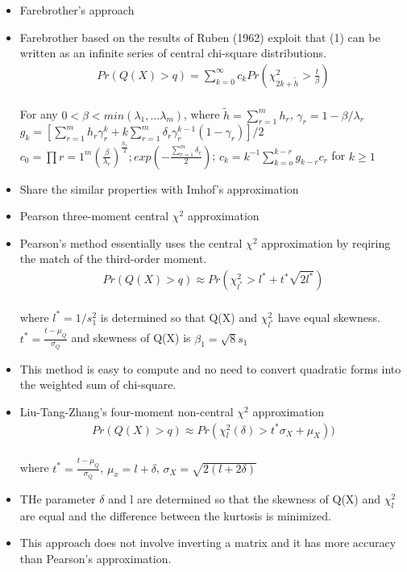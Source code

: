\documentclass[10pt]{beamer}
\begin{document}
\begin{frame}
	\begin{itemize}
	\item Farebrother's approach
	\item Farebrother based on the results of Ruben (1962) exploit that (1) can be written as an infinite series of central chi-square distributions.
	\begin{align}
	Pr(Q(X)>q)=\sum_{k=0}^\infty c_k Pr(\chi_{2k+\tilde{h}}^2 >\frac{t}{\beta})  
	\end{align}\\
	For any $0< \beta <min(\lambda_1,...\lambda_m)$, where $\tilde{h}=\sum_{r=1}^mh_r$, $\gamma_r=1-\beta/\lambda_r$\\
	$g_k=[\sum_{r=1}^mh_r\gamma_r^k+k\sum_{r=1}^m\delta_r\gamma_r^{k-1}(1-\gamma_r)]/2$
	$ c_0=\prod{r=1}^m (\frac{\beta}{\lambda_r})^{\frac{h_r}{2}};exp(-\frac{\sum_{r=1}^m\delta_r}{2})$; $c_k=k^{-1}\sum_{k=o}^{k-r}g_{k-r}c_r$ for $k\geq1$
	\item Share the similar properties with Imhof's approximation
	\end{itemize}	
\end{frame}

\begin{frame}
	\begin{itemize}
		\item Pearson three-moment central $\chi^2$ approximation 
		\item Pearson's method essentially uses the central $\chi^2$ approximation by reqiring the match of the third-order moment.
		\begin{align}
		Pr(Q(X)>q)\approx Pr(\chi_{l^*}^2 >l^*+t^*\sqrt{2l^*})
		\end{align}\\
		where $l^*=1/s_1^2$ is determined so that Q(X) and $\chi_{l^*}^2$ have equal skewness.\\
		$t^*=\frac{t-\mu_Q}{\sigma_Q}$ and skewness of Q(X) is $\beta_1=\sqrt{8}s_1$
		\item This method is easy to compute and no need to convert quadratic forms into the weighted sum of chi-square.
	\end{itemize}
\end{frame}

\begin{frame}
	\begin{itemize}
		\item Liu-Tang-Zhang's four-moment non-central $\chi^2$ approximation
		\begin{align}
		Pr(Q(X)>q)\approx Pr(\chi_l^2(\delta) >t^*\sigma_X+\mu_X))
		\end{align}\\
		where 	$t^*=\frac{t-\mu_Q}{\sigma_Q}$, $\mu_x = l+\delta$, $\sigma_X=\sqrt{2(l+2\delta)}$
		\item THe parameter $\delta$ and l are determined so that the skewness of Q(X) and $\chi_l^2$ are equal and the difference between the kurtosis is minimized.
		\item This approach does not involve inverting a matrix and it has more accuracy than Pearson's approximation.
	\end{itemize}
\end{frame}
\end{document}
